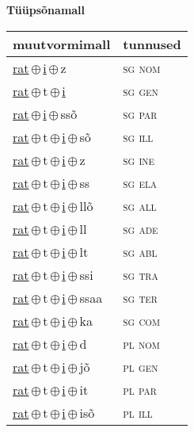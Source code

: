 

\vspace{3.5em}
\noindent \begin{minipage}{\textwidth}
\noindent \textbf{Tüüpsõnamall \,}\\

\begin{sideways}
\begin{tabular}{l l}
muutvormimall & tunnused \\
\hline
\underline{rat}\,$\oplus$\,\underline{i}\,$\oplus$\,z & \textsc{ sg nom } \\
\underline{rat}\,$\oplus$\,t\,$\oplus$\,\underline{i} & \textsc{ sg gen } \\
\underline{rat}\,$\oplus$\,\underline{i}\,$\oplus$\,ssõ & \textsc{ sg par } \\
\underline{rat}\,$\oplus$\,t\,$\oplus$\,\underline{i}\,$\oplus$\,sõ & \textsc{ sg ill } \\
\underline{rat}\,$\oplus$\,t\,$\oplus$\,\underline{i}\,$\oplus$\,z & \textsc{ sg ine } \\
\underline{rat}\,$\oplus$\,t\,$\oplus$\,\underline{i}\,$\oplus$\,ss & \textsc{ sg ela } \\
\underline{rat}\,$\oplus$\,t\,$\oplus$\,\underline{i}\,$\oplus$\,llõ & \textsc{ sg all } \\
\underline{rat}\,$\oplus$\,t\,$\oplus$\,\underline{i}\,$\oplus$\,ll & \textsc{ sg ade } \\
\underline{rat}\,$\oplus$\,t\,$\oplus$\,\underline{i}\,$\oplus$\,lt & \textsc{ sg abl } \\
\underline{rat}\,$\oplus$\,t\,$\oplus$\,\underline{i}\,$\oplus$\,ssi & \textsc{ sg tra } \\
\underline{rat}\,$\oplus$\,t\,$\oplus$\,\underline{i}\,$\oplus$\,ssaa & \textsc{ sg ter } \\
\underline{rat}\,$\oplus$\,t\,$\oplus$\,\underline{i}\,$\oplus$\,ka & \textsc{ sg com } \\
\underline{rat}\,$\oplus$\,t\,$\oplus$\,\underline{i}\,$\oplus$\,d & \textsc{ pl nom } \\
\underline{rat}\,$\oplus$\,t\,$\oplus$\,\underline{i}\,$\oplus$\,jõ & \textsc{ pl gen } \\
\underline{rat}\,$\oplus$\,t\,$\oplus$\,\underline{i}\,$\oplus$\,it & \textsc{ pl par } \\
\underline{rat}\,$\oplus$\,t\,$\oplus$\,\underline{i}\,$\oplus$\,isõ & \textsc{ pl ill } \\

\end{tabular}
\end{sideways}
\end{minipage}
